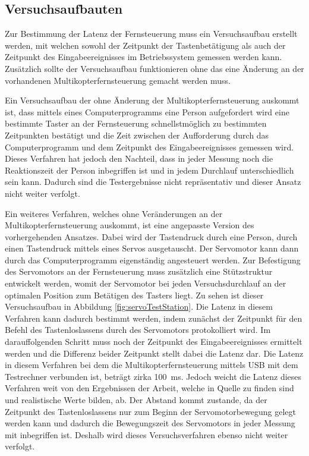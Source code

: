 \subsection{Versuchsaufbauten}
Zur Bestimmung der Latenz der Fernsteuerung muss ein Versuchsaufbau erstellt werden, mit welchen sowohl der Zeitpunkt der Tastenbetätigung als auch der Zeitpunkt des Eingabeereignisses im Betriebssystem gemessen werden kann. Zusätzlich sollte der Versuchsaufbau funktionieren ohne das eine Änderung an der vorhandenen Multikopterfernsteuerung gemacht werden muss.

Ein Versuchsaufbau der ohne Änderung der Multikopterfernsteuerung auskommt ist, dass mittels eines Computerprogramms eine Person aufgefordert wird eine bestimmte Taster an der Fernsteuerung schnellstmöglich zu bestimmten Zeitpunkten bestätigt und die Zeit zwischen der Aufforderung durch das Computerprogramm und dem Zeitpunkt des Eingabeereignisses gemessen wird. Dieses Verfahren hat jedoch den Nachteil, dass in jeder Messung noch die Reaktionszeit der Person inbegriffen ist und in jedem Durchlauf unterschiedlich sein kann. Dadurch sind die Testergebnisse nicht repräsentativ und dieser Ansatz nicht weiter verfolgt.

Ein weiteres Verfahren, welches ohne Veränderungen an der Multikopterfernsteuerung auskommt, ist eine angepasste Version des vorhergehenden Ansatzes. Dabei wird der Tastendruck durch eine Person, durch einen Tastendruck mittels eines Servos ausgetauscht. Der Servomotor kann dann durch das Computerprogramm eigenständig angesteuert werden. Zur Befestigung des Servomotors an der Fernsteuerung muss zusätzlich eine Stützstruktur entwickelt werden, womit der Servomotor bei jeden Versuchsdurchlauf an der optimalen Position zum Betätigen des Tasters liegt. Zu sehen ist dieser Versuchsaufbau in Abbildung \ref{fig:servoTestStation}. Die Latenz in diesem Verfahren kann dadurch bestimmt werden, indem zunächst der Zeitpunkt für den Befehl des Tastenloslassens durch des Servomotors protokolliert wird. Im darauffolgenden Schritt muss noch der Zeitpunkt des Eingabeereignisses ermittelt werden und die Differenz beider Zeitpunkt stellt dabei die Latenz dar. Die Latenz in diesem Verfahren bei dem die Multikopterfernsteuerung mittels USB mit dem Testrechner verbunden ist, beträgt zirka 100~ms. Jedoch weicht die Latenz dieses Verfahren weit von den Ergebnissen der Arbeit, welche in Quelle \cite{wimmerLatenzStation} zu finden sind und realistische Werte bilden, ab. Der Abstand kommt zustande, da der Zeitpunkt des Tastenloslassens nur zum Beginn der Servomotorbewegung gelegt werden kann und dadurch die Bewegungszeit des Servomotors in jeder Messung mit inbegriffen ist. Deshalb wird dieses Versuchsverfahren ebenso nicht weiter verfolgt.

